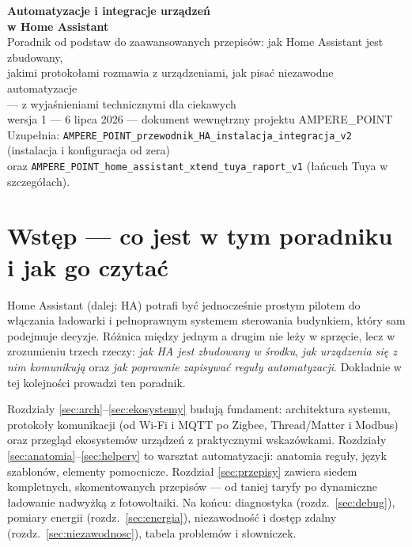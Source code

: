 \documentclass[11pt,a4paper]{article}
\begin{document}
\begin{center}
{\huge\bfseries\sffamily\color{navy} Automatyzacje i integracje urządzeń\\[2pt] w Home Assistant}\\[8pt]
{\large Poradnik od podstaw do zaawansowanych przepisów: jak Home Assistant jest zbudowany,\\ jakimi protokołami rozmawia z urządzeniami, jak pisać niezawodne automatyzacje\\[2pt] --- z wyjaśnieniami technicznymi dla ciekawych}\\[6pt]
{\normalsize wersja 1 --- 6 lipca 2026 --- dokument wewnętrzny projektu AMPERE\_POINT}\\[2pt]
{\small Uzupełnia: \texttt{AMPERE\_POINT\_przewodnik\_HA\_instalacja\_integracja\_v2} (instalacja i konfiguracja od zera)\\ oraz \texttt{AMPERE\_POINT\_home\_assistant\_xtend\_tuya\_raport\_v1} (łańcuch Tuya w szczegółach).}
\end{center}

\vspace{4pt}
\tableofcontents
\newpage

\section{Wstęp --- co jest w tym poradniku i jak go czytać}

Home Assistant (dalej: HA) potrafi być jednocześnie prostym pilotem do włączania ładowarki i pełnoprawnym systemem sterowania budynkiem, który sam podejmuje decyzje. Różnica między jednym a drugim nie leży w sprzęcie, lecz w zrozumieniu trzech rzeczy: \emph{jak HA jest zbudowany w środku}, \emph{jak urządzenia się z nim komunikują} oraz \emph{jak poprawnie zapisywać reguły automatyzacji}. Dokładnie w tej kolejności prowadzi ten poradnik.

Rozdziały \ref{sec:arch}--\ref{sec:ekosystemy} budują fundament: architektura systemu, protokoły komunikacji (od Wi-Fi i MQTT po Zigbee, Thread/Matter i Modbus) oraz przegląd ekosystemów urządzeń z praktycznymi wskazówkami. Rozdziały \ref{sec:anatomia}--\ref{sec:helpery} to warsztat automatyzacji: anatomia reguły, język szablonów, elementy pomocnicze. Rozdział \ref{sec:przepisy} zawiera siedem kompletnych, skomentowanych przepisów --- od taniej taryfy po dynamiczne ładowanie nadwyżką z fotowoltaiki. Na końcu: diagnostyka (rozdz.~\ref{sec:debug}), pomiary energii (rozdz.~\ref{sec:energia}), niezawodność i dostęp zdalny (rozdz.~\ref{sec:niezawodnosc}), tabela problemów i słowniczek.
\end{document}
